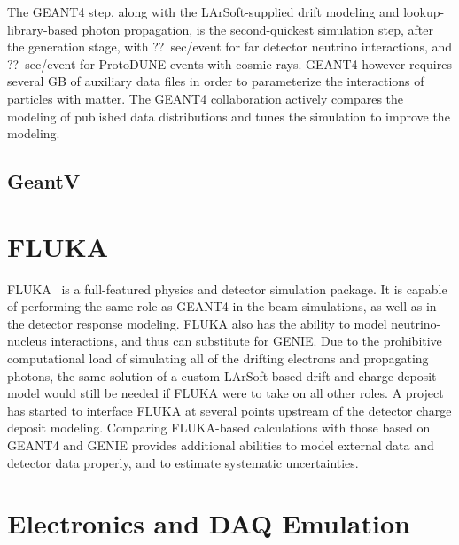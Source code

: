 The GEANT4 step, along with the LArSoft-supplied drift modeling and lookup-library-based photon propagation, 
is the second-quickest simulation step,
after the generation stage, with ??~sec/event for far detector neutrino interactions, and ??~sec/event for
ProtoDUNE events with cosmic rays.  GEANT4 however requires several GB of auxiliary data files in order
to parameterize the interactions of particles with matter.  The GEANT4 collaboration actively compares
the modeling of published data distributions and tunes the simulation to improve the modeling.

\subsection{GeantV}

\section{FLUKA}

FLUKA~\cite{Bohlen:2014buj,Ferrari:2005zk} is a full-featured physics and detector simulation package.  It is capable of
performing the same role as GEANT4 in the beam simulations, as well as in the detector response modeling.
FLUKA also has the ability to model neutrino-nucleus interactions, and thus can substitute for GENIE.
Due to the prohibitive computational load of simulating all of the drifting electrons and propagating
photons, the same solution of a custom LArSoft-based drift and charge deposit model would still be needed
if FLUKA were to take on all other roles.  A project has started to interface FLUKA at several points upstream
of the detector charge deposit modeling.  Comparing FLUKA-based calculations with those based on GEANT4 and
GENIE provides additional abilities to model external data and detector data properly, and to estimate
systematic uncertainties.

\section{Electronics and DAQ Emulation}

